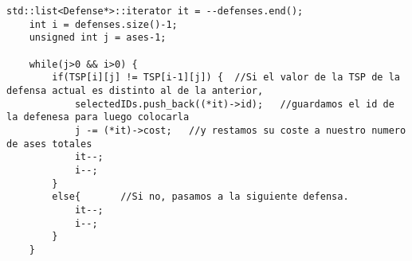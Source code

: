 \begin{lstlisting}
std::list<Defense*>::iterator it = --defenses.end();
    int i = defenses.size()-1;
	unsigned int j = ases-1;

    while(j>0 && i>0) {
        if(TSP[i][j] != TSP[i-1][j]) {	//Si el valor de la TSP de la defensa actual es distinto al de la anterior,
	        selectedIDs.push_back((*it)->id);	//guardamos el id de la defenesa para luego colocarla
	        j -= (*it)->cost;	//y restamos su coste a nuestro numero de ases totales
	        it--;
	        i--;
        }
        else{		//Si no, pasamos a la siguiente defensa.
			it--;
			i--;
        }
    }
\end{lstlisting}